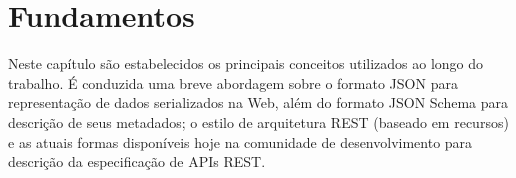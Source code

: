 \chapter{Fundamentos}

Neste capítulo são estabelecidos os principais conceitos utilizados ao longo do trabalho. É conduzida uma breve abordagem sobre o formato JSON para representação de dados serializados na Web, além do formato JSON Schema para descrição de seus metadados; o estilo de arquitetura REST (baseado em recursos) e as atuais formas  disponíveis hoje na comunidade de desenvolvimento para descrição da especificação de APIs REST.






